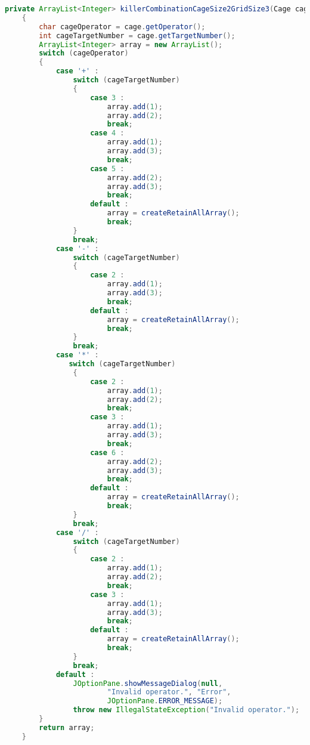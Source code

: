 \begin{lstlisting}[language=Java,basicstyle=\tiny,caption=SolverRuleBased.java]
    private ArrayList<Integer> killerCombinationCageSize2GridSize3(Cage cage)
    {
        char cageOperator = cage.getOperator();
        int cageTargetNumber = cage.getTargetNumber();
        ArrayList<Integer> array = new ArrayList();
        switch (cageOperator)
        {
            case '+' :
                switch (cageTargetNumber)
                {
                    case 3 :
                        array.add(1);
                        array.add(2);
                        break;
                    case 4 :  
                        array.add(1);
                        array.add(3);
                        break;
                    case 5 :
                        array.add(2);
                        array.add(3);
                        break;
                    default :
                        array = createRetainAllArray();
                        break;
                }
                break;
            case '-' :
                switch (cageTargetNumber)
                {
                    case 2 :
                        array.add(1);
                        array.add(3);
                        break;
                    default :
                        array = createRetainAllArray();
                        break;
                }
                break;
            case '*' :
               switch (cageTargetNumber)
                {
                    case 2 :
                        array.add(1);
                        array.add(2);
                        break;
                    case 3 :
                        array.add(1);
                        array.add(3);
                        break;
                    case 6 :
                        array.add(2);
                        array.add(3);
                        break;
                    default :
                        array = createRetainAllArray();
                        break;
                }
                break;
            case '/' :
                switch (cageTargetNumber)
                {
                    case 2 :
                        array.add(1);
                        array.add(2);
                        break;
                    case 3 :
                        array.add(1);
                        array.add(3);
                        break;
                    default :
                        array = createRetainAllArray();
                        break;
                }
                break;
            default :
                JOptionPane.showMessageDialog(null, 
                        "Invalid operator.", "Error", 
                        JOptionPane.ERROR_MESSAGE);
                throw new IllegalStateException("Invalid operator.");
        }
        return array;
    }
    

\end{lstlisting}
